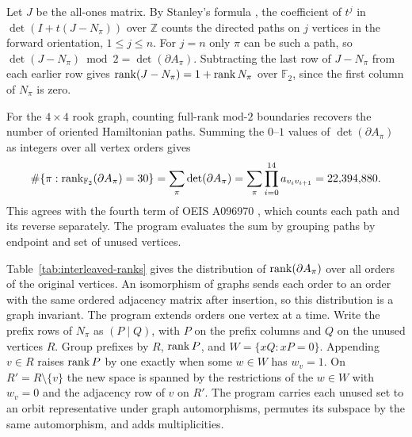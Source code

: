 Let $J$ be the all-ones matrix. By Stanley's formula
\cite[Corollary, p.~171]{StanleyPaths}, the coefficient of $t^j$ in
$\det(I+t(J-N_\pi))$ over $\mathbb Z$ counts the directed paths on $j$ vertices
in the forward orientation, $1\leq j\leq n$. For $j=n$ only $\pi$ can be such a path, so
$\det(J-N_\pi)\bmod 2=\det(\partial A_\pi)$. Subtracting the last row of $J-N_\pi$
from each earlier row gives $\operatorname{rank}(J-N_\pi)=1+\operatorname{rank} N_\pi$ over
$\mathbb F_2$, since the first column of $N_\pi$ is zero.

For the $4\times4$ rook graph, counting full-rank mod-$2$ boundaries
recovers the number of oriented Hamiltonian paths. Summing the $0$--$1$
values of $\det(\partial A_\pi)$ as integers over all vertex orders gives
\[
 \#\{\pi:\operatorname{rank}_{\mathbb F_2}(\partial A_\pi)=30\}
 =\sum_\pi\det(\partial A_\pi)
 =\sum_\pi\prod_{i=0}^{14}a_{v_i v_{i+1}}=22{,}394{,}880.
\]
This agrees with the fourth term of OEIS A096970 \cite{OEISRook},
which counts each path and its reverse separately. The program
evaluates the sum by grouping paths by endpoint and set of unused vertices.

Table~\ref{tab:interleaved-ranks} gives the distribution of
$\operatorname{rank}(\partial A_\pi)$ over all orders of the original vertices. An
isomorphism of graphs sends each order to an order with the same ordered
adjacency matrix after insertion, so this distribution is a graph invariant.
The program
extends orders one vertex at a time. Write the prefix rows of $N_\pi$ as
$(P\mid Q)$, with $P$ on the prefix columns and $Q$ on the unused vertices $R$.
Group prefixes by $R$, $\operatorname{rank} P$, and $W=\{xQ:xP=0\}$.
Appending $v\in R$ raises $\operatorname{rank} P$ by one exactly when some $w\in W$ has $w_v=1$.
On $R'=R\setminus\{v\}$ the new space is spanned by the restrictions of the
$w\in W$ with $w_v=0$ and the adjacency row of $v$ on $R'$.
The program carries each unused set to an orbit representative under graph
automorphisms, permutes its subspace by the same automorphism, and adds multiplicities.

